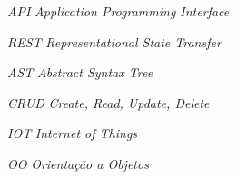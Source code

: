 


\begin{siglas}
    \item[\textit{API}] \textit{Application Programming Interface}
    \item[\textit{REST}] \textit{Representational State Transfer}
    \item[\textit{AST}] \textit{Abstract Syntax Tree}
    \item[\textit{CRUD}] \textit{Create, Read, Update, Delete}
    \item[\textit{IOT}] \textit{Internet of Things}
    \item[\textit{OO}] \textit{Orientação a Objetos}
\end{siglas}

